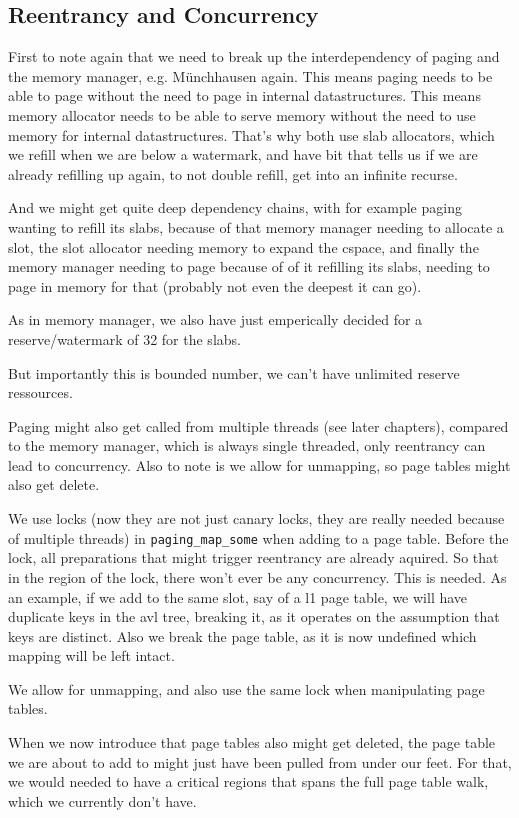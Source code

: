 \subsection{Reentrancy and Concurrency} \label{pag-con}

First to note again that we need to break up the interdependency of paging and
the memory manager, e.g. Münchhausen again.
This means paging needs to be able to page without the need to page in internal
datastructures.
This means memory allocator needs to be able to serve memory without the need to
use memory for internal datastructures.
That's why both use slab allocators, which we refill when we are below a
watermark, and have bit that tells us if we are already refilling up again, to
not double refill, get into an infinite recurse.

And we might get quite deep dependency chains, with for example paging wanting
to refill its slabs, because of that memory manager needing to allocate a slot,
the slot allocator needing memory to expand the cspace, and finally the memory
manager needing to page because of of it refilling its slabs, needing to page in
memory for that (probably not even the deepest it can go).

As in memory manager, we also have just emperically decided for a
reserve/watermark of 32 for the slabs.

But importantly this is bounded number, we can't have unlimited reserve
ressources.

Paging might also get called from multiple threads (see later chapters),
compared to the memory manager, which is always single threaded, only reentrancy
can lead to concurrency.
Also to note is we allow for unmapping, so page tables might also get delete.

We use locks (now they are not just canary locks, they are really needed because
of multiple threads) in \verb|paging_map_some| when adding to a page table.
Before the lock, all preparations that might trigger reentrancy are already
aquired.
So that in the region of the lock, there won't ever be any concurrency.
This is needed.
As an example, if we add to the same slot, say of a l1 page table, we will
have duplicate keys in the avl tree, breaking it, as it operates on the
assumption that keys are distinct.
Also we break the page table, as it is now undefined which mapping will be left
intact.

We allow for unmapping, and also use the same lock when manipulating page
tables.

When we now introduce that page tables also might get deleted, the page table we
are about to add to might just have been pulled from under our feet.
For that, we would needed to have a critical regions that spans the full page
table walk, which we currently don't have.

